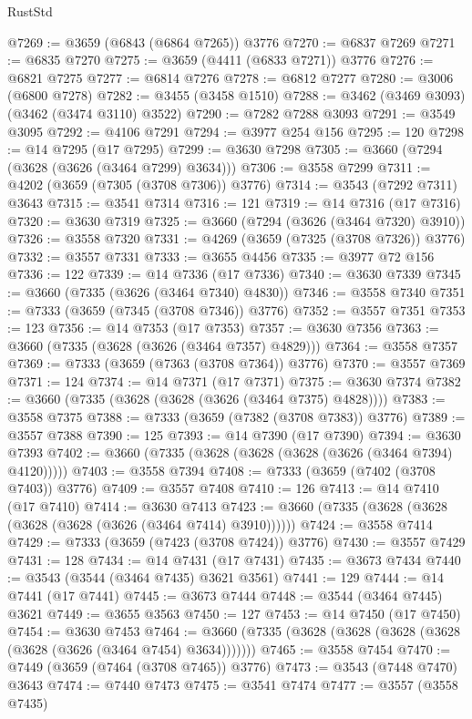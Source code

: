 \begin{lexlean}{RustStd}
\begin{coremodule}
@7269 := @3659 (@6843 (@6864 @7265)) @3776
@7270 := @6837 @7269
@7271 := @6835 @7270
@7275 := @3659 (@4411 (@6833 @7271)) @3776
@7276 := @6821 @7275
@7277 := @6814 @7276
@7278 := @6812 @7277
@7280 := @3006 (@6800 @7278)
@7282 := @3455 (@3458 @1510)
@7288 := @3462 (@3469 @3093) (@3462 (@3474 @3110) @3522)
@7290 := @7282 @7288 @3093
@7291 := @3549 @3095
@7292 := @4106 @7291
@7294 := @3977 @254 @156
@7295 := 120
@7298 := @14 @7295 (@17 @7295)
@7299 := @3630 @7298
@7305 := @3660 (@7294 (@3628 (@3626 (@3464 @7299) @3634)))
@7306 := @3558 @7299
@7311 := @4202 (@3659 (@7305 (@3708 @7306)) @3776)
@7314 := @3543 (@7292 @7311) @3643
@7315 := @3541 @7314
@7316 := 121
@7319 := @14 @7316 (@17 @7316)
@7320 := @3630 @7319
@7325 := @3660 (@7294 (@3626 (@3464 @7320) @3910))
@7326 := @3558 @7320
@7331 := @4269 (@3659 (@7325 (@3708 @7326)) @3776)
@7332 := @3557 @7331
@7333 := @3655 @4456
@7335 := @3977 @72 @156
@7336 := 122
@7339 := @14 @7336 (@17 @7336)
@7340 := @3630 @7339
@7345 := @3660 (@7335 (@3626 (@3464 @7340) @4830))
@7346 := @3558 @7340
@7351 := @7333 (@3659 (@7345 (@3708 @7346)) @3776)
@7352 := @3557 @7351
@7353 := 123
@7356 := @14 @7353 (@17 @7353)
@7357 := @3630 @7356
@7363 := @3660 (@7335 (@3628 (@3626 (@3464 @7357) @4829)))
@7364 := @3558 @7357
@7369 := @7333 (@3659 (@7363 (@3708 @7364)) @3776)
@7370 := @3557 @7369
@7371 := 124
@7374 := @14 @7371 (@17 @7371)
@7375 := @3630 @7374
@7382 := @3660 (@7335 (@3628 (@3628 (@3626 (@3464 @7375) @4828))))
@7383 := @3558 @7375
@7388 := @7333 (@3659 (@7382 (@3708 @7383)) @3776)
@7389 := @3557 @7388
@7390 := 125
@7393 := @14 @7390 (@17 @7390)
@7394 := @3630 @7393
@7402 := @3660 (@7335 (@3628 (@3628 (@3628 (@3626 (@3464 @7394) @4120)))))
@7403 := @3558 @7394
@7408 := @7333 (@3659 (@7402 (@3708 @7403)) @3776)
@7409 := @3557 @7408
@7410 := 126
@7413 := @14 @7410 (@17 @7410)
@7414 := @3630 @7413
@7423 := @3660 (@7335 (@3628 (@3628 (@3628 (@3628 (@3626 (@3464 @7414) @3910))))))
@7424 := @3558 @7414
@7429 := @7333 (@3659 (@7423 (@3708 @7424)) @3776)
@7430 := @3557 @7429
@7431 := 128
@7434 := @14 @7431 (@17 @7431)
@7435 := @3673 @7434
@7440 := @3543 (@3544 (@3464 @7435) @3621 @3561)
@7441 := 129
@7444 := @14 @7441 (@17 @7441)
@7445 := @3673 @7444
@7448 := @3544 (@3464 @7445) @3621
@7449 := @3655 @3563
@7450 := 127
@7453 := @14 @7450 (@17 @7450)
@7454 := @3630 @7453
@7464 := @3660 (@7335 (@3628 (@3628 (@3628 (@3628 (@3628 (@3626 (@3464 @7454) @3634)))))))
@7465 := @3558 @7454
@7470 := @7449 (@3659 (@7464 (@3708 @7465)) @3776)
@7473 := @3543 (@7448 @7470) @3643
@7474 := @7440 @7473
@7475 := @3541 @7474
@7477 := @3557 (@3558 @7435)

\end{coremodule}
\end{lexlean}
